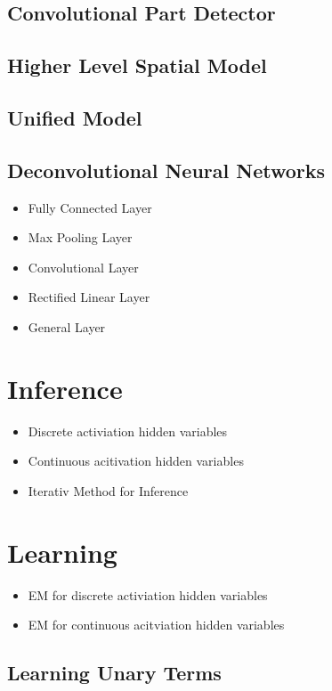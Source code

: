 \documentclass[10pt,twocolumn,letterpaper]{article}
\begin{document}
\subsection{Convolutional Part Detector}

\subsection{Higher Level Spatial Model}

\subsection{Unified Model}

\subsection{Deconvolutional Neural Networks}
\begin{itemize}
\item Fully Connected Layer
\item Max Pooling Layer
\item Convolutional Layer
\item Rectified Linear Layer
\item General Layer
\end{itemize}

\section{Inference}
\begin{itemize}
  \item Discrete activiation hidden variables
  \item Continuous acitivation hidden variables
  \item Iterativ Method for Inference
\end{itemize}

\section{Learning}
\begin{itemize}
  \item EM for discrete activiation hidden variables
  \item EM for continuous acitviation hidden variables
\end{itemize}

\subsection{Learning Unary Terms}
\end{document}
